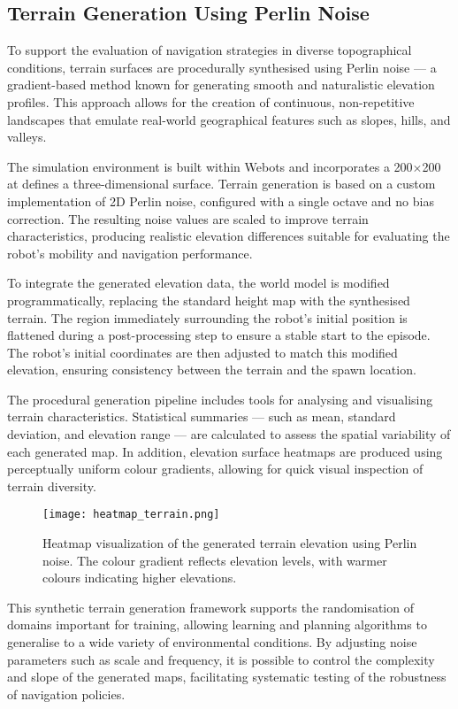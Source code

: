 \documentclass[11pt,twocolumn]{article}
\begin{document}
\subsection{Terrain Generation Using Perlin Noise}

To support the evaluation of navigation strategies in diverse topographical conditions, terrain surfaces are procedurally synthesised using Perlin noise — a gradient-based method known for generating smooth and naturalistic elevation profiles. This approach allows for the creation of continuous, non-repetitive landscapes that emulate real-world geographical features such as slopes, hills, and valleys.

The simulation environment is built within Webots and incorporates a  200\(\times\)200 at defines a three-dimensional surface. Terrain generation is based on a custom implementation of 2D Perlin noise, configured with a single octave and no bias correction. The resulting noise values are scaled to improve terrain characteristics, producing realistic elevation differences suitable for evaluating the robot's mobility and navigation performance.

To integrate the generated elevation data, the world model is modified programmatically, replacing the standard height map with the synthesised terrain. The region immediately surrounding the robot's initial position is flattened during a post-processing step to ensure a stable start to the episode. The robot's initial coordinates are then adjusted to match this modified elevation, ensuring consistency between the terrain and the spawn location.

The procedural generation pipeline includes tools for analysing and visualising terrain characteristics. Statistical summaries — such as mean, standard deviation, and elevation range — are calculated to assess the spatial variability of each generated map. In addition, elevation surface heatmaps are produced using perceptually uniform colour gradients, allowing for quick visual inspection of terrain diversity.

\begin{figure}[htbp]
    \centering
    \texttt{[image: heatmap\_terrain.png]}
    \caption{Heatmap visualization of the generated terrain elevation using Perlin noise. The colour gradient reflects elevation levels, with warmer colours indicating higher elevations.}
    \label{fig:heatmap_terrain}
\end{figure}


This synthetic terrain generation framework supports the randomisation of domains important for training, allowing learning and planning algorithms to generalise to a wide variety of environmental conditions. By adjusting noise parameters such as scale and frequency, it is possible to control the complexity and slope of the generated maps, facilitating systematic testing of the robustness of navigation policies.
\end{document}
